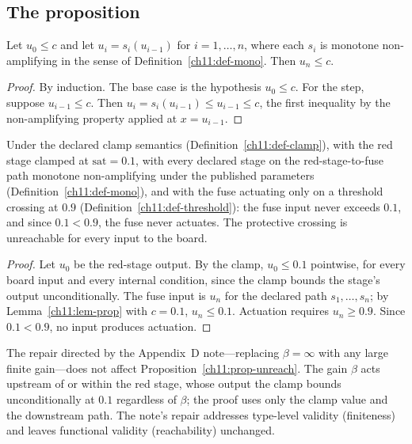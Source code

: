 \subsection{The proposition}

\begin{lemma}\label{ch11:lem-prop}
Let $u_0\le c$ and let $u_{i}=s_i(u_{i-1})$ for $i=1,\ldots,n$, where each $s_i$ is monotone non-amplifying in the sense of Definition~\ref{ch11:def-mono}. Then $u_n\le c$.
\end{lemma}

\begin{proof}
By induction. The base case is the hypothesis $u_0\le c$. For the step, suppose $u_{i-1}\le c$. Then $u_i=s_i(u_{i-1})\le u_{i-1}\le c$, the first inequality by the non-amplifying property applied at $x=u_{i-1}$.
\end{proof}

\begin{proposition}\label{ch11:prop-unreach}
Under the declared clamp semantics (Definition~\ref{ch11:def-clamp}), with the red stage clamped at $\mathrm{sat}=0.1$, with every declared stage on the red-stage-to-fuse path monotone non-amplifying under the published parameters (Definition~\ref{ch11:def-mono}), and with the fuse actuating only on a threshold crossing at $0.9$ (Definition~\ref{ch11:def-threshold}): the fuse input never exceeds $0.1$, and since $0.1<0.9$, the fuse never actuates. The protective crossing is unreachable for every input to the board.
\end{proposition}

\begin{proof}
Let $u_0$ be the red-stage output. By the clamp, $u_0\le 0.1$ pointwise, for every board input and every internal condition, since the clamp bounds the stage's output unconditionally. The fuse input is $u_n$ for the declared path $s_1,\ldots,s_n$; by Lemma~\ref{ch11:lem-prop} with $c=0.1$, $u_n\le 0.1$. Actuation requires $u_n\ge 0.9$. Since $0.1<0.9$, no input produces actuation.
\end{proof}

\begin{corollary}\label{ch11:cor-note}
The repair directed by the Appendix~D note---replacing $\beta=\infty$ with any large finite gain---does not affect Proposition~\ref{ch11:prop-unreach}. The gain $\beta$ acts upstream of or within the red stage, whose output the clamp bounds unconditionally at $0.1$ regardless of $\beta$; the proof uses only the clamp value and the downstream path. The note's repair addresses type-level validity (finiteness) and leaves functional validity (reachability) unchanged.
\end{corollary}

